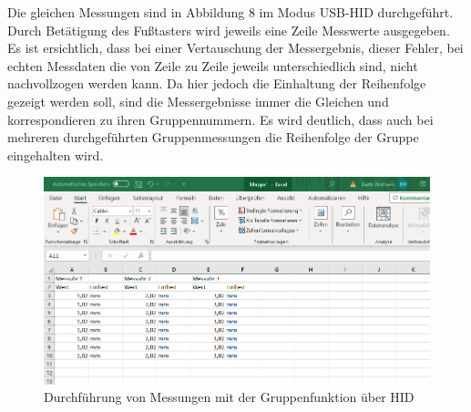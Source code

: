 Die gleichen Messungen sind in Abbildung 8 im Modus USB-HID durchgeführt. Durch Betätigung des Fußtasters wird jeweils eine Zeile Messwerte ausgegeben. Es ist ersichtlich, dass bei einer Vertauschung der Messergebnis, dieser Fehler, bei echten Messdaten die von Zeile zu Zeile jeweils unterschiedlich sind, nicht nachvollzogen werden kann. Da hier jedoch die Einhaltung der Reihenfolge gezeigt werden soll, sind die Messergebnisse immer die Gleichen und korrespondieren zu ihren Gruppennummern. Es wird deutlich, dass auch bei mehreren durchgeführten Gruppenmessungen die Reihenfolge der Gruppe eingehalten wird.
\begin{figure}[H] 
	\centering
	\includegraphics[width=\textwidth]{figures/USBHIDGroup.png}
	\caption{Durchführung von Messungen mit der Gruppenfunktion über HID}
\end{figure}

